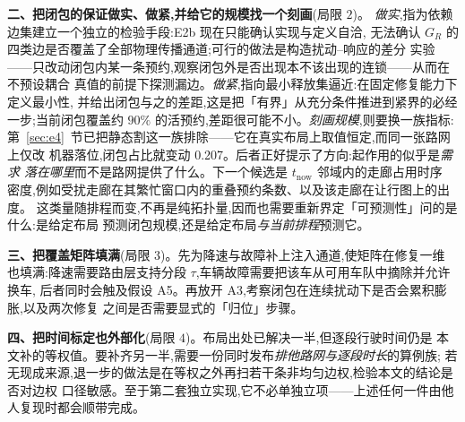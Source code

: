 \documentclass[manuscript,screen,review]{acmart}
\newcommand{\ClosureAliveFrac}{90\%}
\newcommand{\PubCloSpread}{0.207}
\begin{document}
\textbf{二、把闭包的保证做实、做紧,并给它的规模找一个刻画}(局限 \(2\))。
\emph{做实},指为依赖边集建立一个独立的检验手段:E2b 现在只能确认实现与定义自洽,
无法确认 \(G_R\) 的四类边是否覆盖了全部物理传播通道;可行的做法是构造扰动--响应的差分
实验——只改动闭包内某一条预约,观察闭包外是否出现本不该出现的连锁——从而在不预设耦合
真值的前提下探测漏边。\emph{做紧},指向最小释放集逼近:在固定修复能力下定义最小性,
并给出闭包与之的差距,这是把「有界」从充分条件推进到紧界的必经一步;当前闭包覆盖约
\(\ClosureAliveFrac\) 的活预约,差距很可能不小。\emph{刻画规模},则要换一族指标:
第~\ref{sec:e4}~节已把静态割这一族排除——它在真实布局上取值恒定,而同一张路网上仅改
机器落位,闭包占比就变动 \PubCloSpread。后者正好提示了方向:起作用的似乎是\emph{需求
落在哪里}而不是路网提供了什么。下一个候选是 \(t_{\mathrm{now}}\) 邻域内的走廊占用时序
密度,例如受扰走廊在其繁忙窗口内的重叠预约条数、以及该走廊在让行图上的出度。
这类量随排程而变,不再是纯拓扑量,因而也需要重新界定「可预测性」问的是什么:是给定布局
预测闭包规模,还是给定布局\emph{与当前排程}预测它。

\textbf{三、把覆盖矩阵填满}(局限 \(3\))。先为降速与故障补上注入通道,使矩阵在修复一维
也填满:降速需要路由层支持分段 \(\tau\),车辆故障需要把该车从可用车队中摘除并允许换车,
后者同时会触及假设 A5。再放开 A3,考察闭包在连续扰动下是否会累积膨胀,以及两次修复
之间是否需要显式的「归位」步骤。

\textbf{四、把时间标定也外部化}(局限 \(4\))。布局出处已解决一半,但逐段行驶时间仍是
本文补的等权值。要补齐另一半,需要一份同时发布\emph{排他路网与逐段时长}的算例族;
若无现成来源,退一步的做法是在等权之外再扫若干条非均匀边权,检验本文的结论是否对边权
口径敏感。至于第二套独立实现,它不必单独立项——上述任何一件由他人复现时都会顺带完成。



\end{document}
